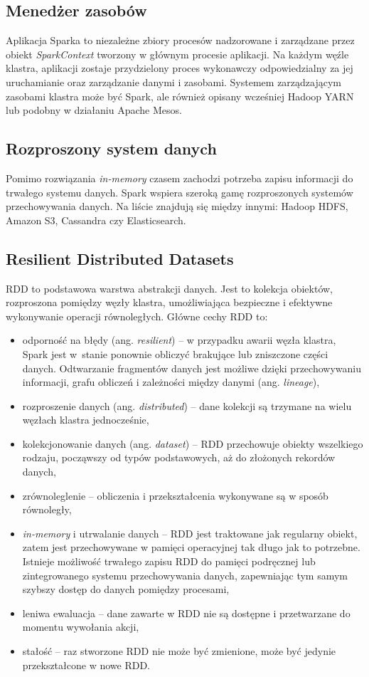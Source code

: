 \documentclass[magisterska]{pracamgr}
\begin{document}
\subsection{Menedżer zasobów} \label{Menedżer zasobów}
Aplikacja Sparka to niezależne zbiory procesów nadzorowane i zarządzane przez obiekt \textit{SparkContext} tworzony w głównym procesie aplikacji. Na każdym węźle klastra, aplikacji zostaje przydzielony proces wykonawczy odpowiedzialny za jej uruchamianie oraz zarządzanie danymi i zasobami. Systemem zarządzającym zasobami klastra może być Spark, ale również opisany wcześniej Hadoop YARN lub podobny w działaniu Apache Mesos.

\subsection{Rozproszony system danych} \label{Rozproszony system danych}
Pomimo rozwiązania \textit{in-memory} czasem zachodzi potrzeba zapisu informacji do trwałego systemu danych. Spark wspiera szeroką gamę rozproszonych systemów przechowywania danych. Na liście znajdują się między innymi: Hadoop HDFS, Amazon S3, Cassandra czy Elasticsearch.

\subsection{Resilient Distributed Datasets} \label{RDD}
RDD to podstawowa warstwa abstrakcji danych. Jest to kolekcja obiektów, rozproszona pomiędzy węzły klastra, umożliwiająca bezpieczne i efektywne wykonywanie operacji równoległych. Główne cechy RDD to:
\begin{itemize}
    \item odporność na błędy (ang. \textit{resilient}) -- w przypadku awarii węzła klastra, Spark jest w~stanie ponownie obliczyć brakujące lub zniszczone części danych. Odtwarzanie fragmentów danych jest możliwe dzięki przechowywaniu informacji, grafu obliczeń i zależności między danymi (ang. \textit{lineage}),
    \item rozproszenie danych (ang. \textit{distributed}) -- dane kolekcji są trzymane na wielu węzłach klastra jednocześnie,
    \item kolekcjonowanie danych (ang. \textit{dataset}) -- RDD przechowuje obiekty wszelkiego rodzaju, począwszy od typów podstawowych, aż do złożonych rekordów danych,
    \item zrównoleglenie -- obliczenia i przekształcenia wykonywane są w sposób równoległy,
    \item \textit{in-memory} i utrwalanie danych -- RDD jest traktowane jak regularny obiekt, zatem jest przechowywane w pamięci operacyjnej tak długo jak to potrzebne. Istnieje możliwość trwałego zapisu RDD do pamięci podręcznej lub zintegrowanego systemu przechowywania danych, zapewniając tym samym szybszy dostęp do danych pomiędzy procesami,
    \item leniwa ewaluacja -- dane zawarte w RDD nie są dostępne i przetwarzane do momentu wywołania akcji,
    \item stałość -- raz stworzone RDD nie może być zmienione, może być jedynie przekształcone w nowe RDD.
    
\end{itemize}
\end{document}
